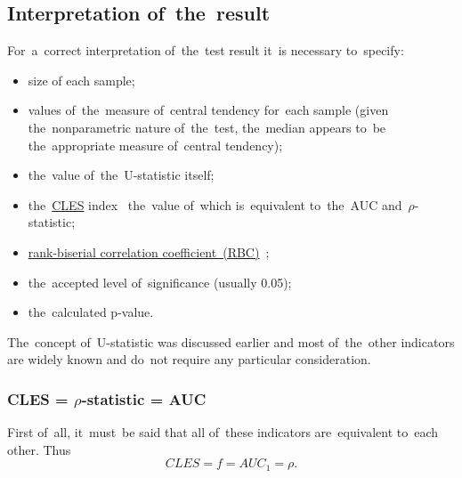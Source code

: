 \documentclass[russian,english]{scrreprt}
\begin{document}
\subsection{Interpretation of~the~result}
For~a~correct interpretation of~the~test result it~is necessary to~specify:
\begin{itemize}
	\item size of each sample;
	\item values of~the~measure of~central tendency for~each sample (given the~nonparametric nature of~the~test, the~median appears to~be the~appropriate measure of~central tendency);
	\item the~value of~the~U-statistic itself;
	\item the~\href{https://en.wikipedia.org/wiki/Effect_size#Common_language_effect_size}{CLES} index~\cite{Wiki:CLES} the~value of~which is~equivalent to~the~AUC and~$\rho$-statistic;
	\item \href{https://en.wikipedia.org/wiki/Effect_size#Rank-biserial_correlation}{rank-biserial correlation coefficient~(RBC)}~\cite{Wiki:rank-biserial-correlation};
	\item the~accepted level of~significance (usually 0.05);
	\item the~calculated p-value.
\end{itemize}
The~concept of~U-statistic was discussed earlier and most of~the~other indicators are widely known and do~not require any particular consideration. 
\subsubsection{CLES = $\rho$-statistic = AUC}
First of~all, it~must~be said that all of~these indicators are~equivalent to~each other. Thus
\begin{equation}\label{eq:AUC=CLES}
CLES = f = AUC_{1} = \rho.
\end{equation}
\end{document}
